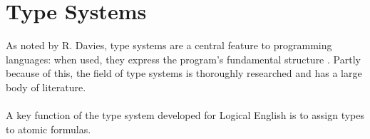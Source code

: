 \documentclass[../main.tex]{subfiles}
\begin{document}

\section{Type Systems}
\label{section:type-system-review}
As noted by R. Davies, type systems are a central feature to programming languages: when used, they express the program's fundamental structure \cite[p.~1]{refinement_types}. Partly because of this, the field of type systems is thoroughly researched and has a large body of literature. 
\\
\\
A key function of the type system developed for Logical English is to assign types to atomic formulas. 
\end{document}
